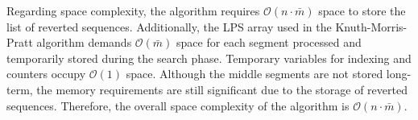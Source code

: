 Regarding space complexity, the algorithm requires $\mathcal{O}(n \cdot \bar{m} )$ space to store the list of reverted sequences. Additionally, the LPS array used in the Knuth-Morris-Pratt algorithm demands $\mathcal{O}(\bar{m} )$ space for each segment processed and temporarily stored during the search phase. Temporary variables for indexing and counters occupy $\mathcal{O}(1)$ space. Although the middle segments are not stored long-term, the memory requirements are still significant due to the storage of reverted sequences. Therefore, the overall space complexity of the algorithm is $\mathcal{O}(n \cdot \bar{m} )$.

















































